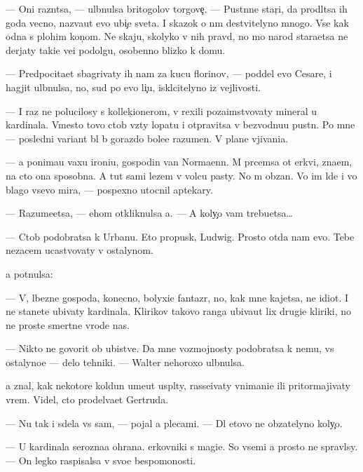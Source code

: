 \documentclass[10pt]{book}
\begin{document}
— Oni razn{\ia}tsa, — ul{\yi}bnulsa britogolov{\yi}{\y} torgove{\c}. — Pust{\yi}nn{\yi}{\y}e star{\c}i, da prodl{\ia}tsa ih goda vecno, naz{\yi}va{\y}ut {\y}evo ubi{\y}{\c}e{\y} sveta. I skazok o n{\e}m de{\y}stvitelyno mnogo. Vse kak odna s plohim kon{\c}om. Ne skaju, skolyko v nih pravd{\yi}, no mo{\y} narod stara{\y}etsa ne derjaty taki{\y}e ve{\x}i podolgu, osobenno blizko k domu.

— Predpocita{\y}et sbagrivaty ih nam za kucu florinov, — poddel {\y}evo Cesare, i hagjit ul{\yi}bnulsa, no, sud{\ia} po {\y}evo li{\c}u, iskl{\iu}citelyno iz vejlivosti.

— I raz ne polucilosy s kollek{\c}ionerom, v{\yi} rexili poza{\y}imstvovaty mineral u kardinala. Vmesto tovo ctob{\yi} vz{\ia}ty lopatu i otpravitsa v bezvodnu{\y}u pust{\yi}n{\iu}. Po mne — posledni{\y} variant b{\yi}l b{\yi} gorazdo bole{\y}e razumen. V plane v{\yi}jivani{\y}a.

— {\Y}a ponima{\y}u vaxu ironi{\y}u, gospodin van Normaenn. M{\yi} pr{\ia}cemsa ot {\C}erkvi, zna{\y}em, na cto ona sposobna. A tut sami lezem v volc{\y}u pasty. No m{\yi} ob{\ia}zan{\yi}. Vo im{\ia} l{\iu}de{\y} i vo blago vsevo mira, — pospexno utocnil aptekary.

— Razume{\y}etsa, — ehom otkliknulsa {\y}a. — A koly{\c}o vam trebu{\y}etsa…

— Ctob{\yi} podobratsa k Urbanu. Eto propusk, Ludwig. Prosto otda{\y} nam {\y}evo. Tebe nezacem ucastvovaty v ostalynom.

{\Y}a pot{\ia}nulsa:

— V{\yi}, l{\iu}bezn{\yi}{\y}e gospoda, konecno, bolyxi{\y}e fantaz{\e}r{\yi}, no, kak mne kajetsa, ne idiot{\yi}. I ne stanete ubivaty kardinala. Klirikov takovo ranga ubiva{\y}ut lix drugi{\y}e kliriki, no ne prost{\yi}{\y}e smertn{\yi}{\y}e vrode nas.

— Nikto ne govorit ob ubi{\y}stve. Da{\y} mne vozmojnosty podobratsa k nemu, vs{\e} ostalyno{\y}e — delo tehniki. — Walter nehoroxo ul{\yi}bnulsa.

{\Y}a znal, kak nekotor{\yi}{\y}e koldun{\yi} ume{\y}ut us{\yi}pl{\ia}ty, rasse{\y}ivaty vnimani{\y}e ili pritormajivaty vrem{\ia}. Videl, cto prodel{\yi}va{\y}et Gertruda.

— Nu tak i sdela{\y} vs{\e} sam, — pojal {\y}a plecami. — Dl{\ia} etovo ne ob{\ia}zatelyno koly{\c}o.

— U kardinala ser{\y}ozna{\y}a ohrana. {\C}erkovniki s magi{\y}e{\y}. So vsemi {\y}a prosto ne spravl{\iu}sy. — On legko raspisalsa v svo{\y}e{\y} bespomo{\x}nosti.
\end{document}
